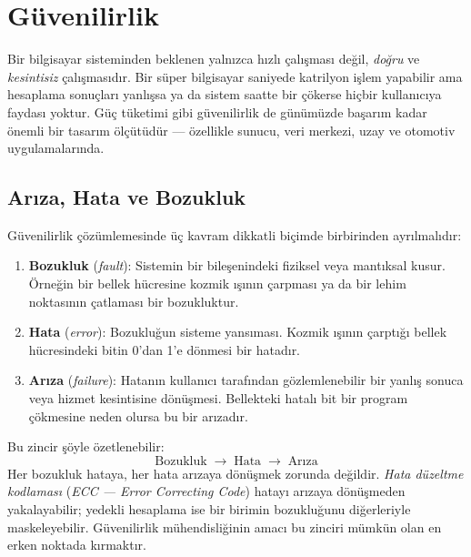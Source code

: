 \section{Güvenilirlik}
\label{sec:guvenilirlik}

Bir bilgisayar sisteminden beklenen yalnızca hızlı çalışması değil, \emph{doğru} ve \emph{kesintisiz} çalışmasıdır. Bir süper bilgisayar saniyede katrilyon işlem yapabilir ama hesaplama sonuçları yanlışsa ya da sistem saatte bir çökerse hiçbir kullanıcıya faydası yoktur. Güç tüketimi gibi güvenilirlik de günümüzde başarım kadar önemli bir tasarım ölçütüdür --- özellikle sunucu, veri merkezi, uzay ve otomotiv uygulamalarında.

\subsection{Arıza, Hata ve Bozukluk}
\label{subsec:ariza-hata-bozukluk}

Güvenilirlik çözümlemesinde üç kavram dikkatli biçimde birbirinden ayrılmalıdır:

\begin{enumerate}
    \item \textbf{Bozukluk} (\emph{fault}): Sistemin bir bileşenindeki fiziksel veya mantıksal kusur. Örneğin bir bellek hücresine kozmik ışının çarpması ya da bir lehim noktasının çatlaması bir bozukluktur.
    \item \textbf{Hata} (\emph{error}): Bozukluğun sisteme yansıması. Kozmik ışının çarptığı bellek hücresindeki bitin 0'dan 1'e dönmesi bir hatadır.
    \item \textbf{Arıza} (\emph{failure}): Hatanın kullanıcı tarafından gözlemlenebilir bir yanlış sonuca veya hizmet kesintisine dönüşmesi. Bellekteki hatalı bit bir program çökmesine neden olursa bu bir arızadır.
\end{enumerate}

Bu zincir şöyle özetlenebilir:
%
\[
\text{Bozukluk} \;\longrightarrow\; \text{Hata} \;\longrightarrow\; \text{Arıza}
\]
%
Her bozukluk hataya, her hata arızaya dönüşmek zorunda değildir. \emph{Hata düzeltme kodlaması} (\emph{ECC --- Error Correcting Code}) hatayı arızaya dönüşmeden yakalayabilir; yedekli hesaplama ise bir birimin bozukluğunu diğerleriyle maskeleyebilir. Güvenilirlik mühendisliğinin amacı bu zinciri mümkün olan en erken noktada kırmaktır.

